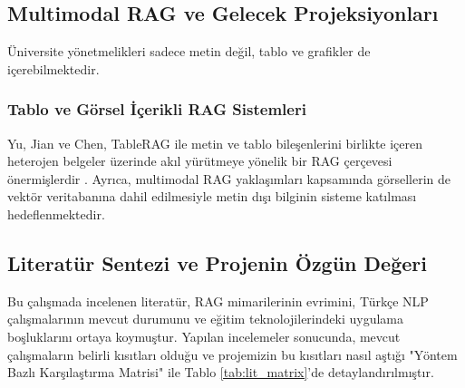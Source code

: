 \documentclass[12pt,a4paper]{report}
\begin{document}
\subsection{Multimodal RAG ve Gelecek Projeksiyonları}
Üniversite yönetmelikleri sadece metin değil, tablo ve grafikler de içerebilmektedir. 

\subsubsection{Tablo ve Görsel İçerikli RAG Sistemleri}
Yu, Jian ve Chen, TableRAG ile metin ve tablo bileşenlerini birlikte içeren heterojen belgeler üzerinde akıl yürütmeye yönelik bir RAG çerçevesi önermişlerdir \cite{yu2024tablerag}. Ayrıca, multimodal RAG yaklaşımları kapsamında görsellerin de vektör veritabanına dahil edilmesiyle metin dışı bilginin sisteme katılması hedeflenmektedir.

\subsection{Literatür Sentezi ve Projenin Özgün Değeri}
Bu çalışmada incelenen literatür, RAG mimarilerinin evrimini, Türkçe NLP çalışmalarının mevcut durumunu ve eğitim teknolojilerindeki uygulama boşluklarını ortaya koymuştur. Yapılan incelemeler sonucunda, mevcut çalışmaların belirli kısıtları olduğu ve projemizin bu kısıtları nasıl aştığı "Yöntem Bazlı Karşılaştırma Matrisi" ile Tablo \ref{tab:lit_matrix}'de detaylandırılmıştır.
\end{document}
